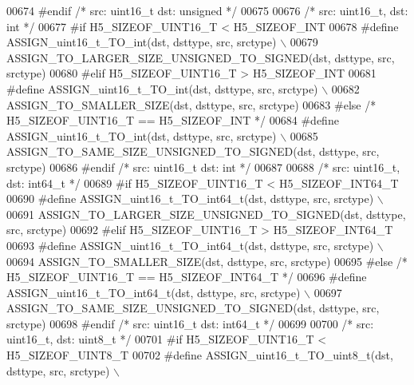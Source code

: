 \begin{DoxyCode}
00674 \textcolor{preprocessor}{#endif }\textcolor{comment}{/* src: uint16\_t dst: unsigned */}\textcolor{preprocessor}{}
00675 
00676 \textcolor{comment}{/* src: uint16\_t, dst: int */}
00677 \textcolor{preprocessor}{#if H5\_SIZEOF\_UINT16\_T < H5\_SIZEOF\_INT}
00678 \textcolor{preprocessor}{    #define ASSIGN\_uint16\_t\_TO\_int(dst, dsttype, src, srctype) \(\backslash\)}
00679 \textcolor{preprocessor}{        ASSIGN\_TO\_LARGER\_SIZE\_UNSIGNED\_TO\_SIGNED(dst, dsttype, src, srctype)}
00680 \textcolor{preprocessor}{#elif H5\_SIZEOF\_UINT16\_T > H5\_SIZEOF\_INT}
00681 \textcolor{preprocessor}{    #define ASSIGN\_uint16\_t\_TO\_int(dst, dsttype, src, srctype) \(\backslash\)}
00682 \textcolor{preprocessor}{        ASSIGN\_TO\_SMALLER\_SIZE(dst, dsttype, src, srctype)}
00683 \textcolor{preprocessor}{#else }\textcolor{comment}{/* H5\_SIZEOF\_UINT16\_T == H5\_SIZEOF\_INT */}\textcolor{preprocessor}{}
00684 \textcolor{preprocessor}{    #define ASSIGN\_uint16\_t\_TO\_int(dst, dsttype, src, srctype) \(\backslash\)}
00685 \textcolor{preprocessor}{        ASSIGN\_TO\_SAME\_SIZE\_UNSIGNED\_TO\_SIGNED(dst, dsttype, src, srctype)}
00686 \textcolor{preprocessor}{#endif }\textcolor{comment}{/* src: uint16\_t dst: int */}\textcolor{preprocessor}{}
00687 
00688 \textcolor{comment}{/* src: uint16\_t, dst: int64\_t */}
00689 \textcolor{preprocessor}{#if H5\_SIZEOF\_UINT16\_T < H5\_SIZEOF\_INT64\_T}
00690 \textcolor{preprocessor}{    #define ASSIGN\_uint16\_t\_TO\_int64\_t(dst, dsttype, src, srctype) \(\backslash\)}
00691 \textcolor{preprocessor}{        ASSIGN\_TO\_LARGER\_SIZE\_UNSIGNED\_TO\_SIGNED(dst, dsttype, src, srctype)}
00692 \textcolor{preprocessor}{#elif H5\_SIZEOF\_UINT16\_T > H5\_SIZEOF\_INT64\_T}
00693 \textcolor{preprocessor}{    #define ASSIGN\_uint16\_t\_TO\_int64\_t(dst, dsttype, src, srctype) \(\backslash\)}
00694 \textcolor{preprocessor}{        ASSIGN\_TO\_SMALLER\_SIZE(dst, dsttype, src, srctype)}
00695 \textcolor{preprocessor}{#else }\textcolor{comment}{/* H5\_SIZEOF\_UINT16\_T == H5\_SIZEOF\_INT64\_T */}\textcolor{preprocessor}{}
00696 \textcolor{preprocessor}{    #define ASSIGN\_uint16\_t\_TO\_int64\_t(dst, dsttype, src, srctype) \(\backslash\)}
00697 \textcolor{preprocessor}{        ASSIGN\_TO\_SAME\_SIZE\_UNSIGNED\_TO\_SIGNED(dst, dsttype, src, srctype)}
00698 \textcolor{preprocessor}{#endif }\textcolor{comment}{/* src: uint16\_t dst: int64\_t */}\textcolor{preprocessor}{}
00699 
00700 \textcolor{comment}{/* src: uint16\_t, dst: uint8\_t */}
00701 \textcolor{preprocessor}{#if H5\_SIZEOF\_UINT16\_T < H5\_SIZEOF\_UINT8\_T}
00702 \textcolor{preprocessor}{    #define ASSIGN\_uint16\_t\_TO\_uint8\_t(dst, dsttype, src, srctype) \(\backslash\)}

\end{DoxyCode}
